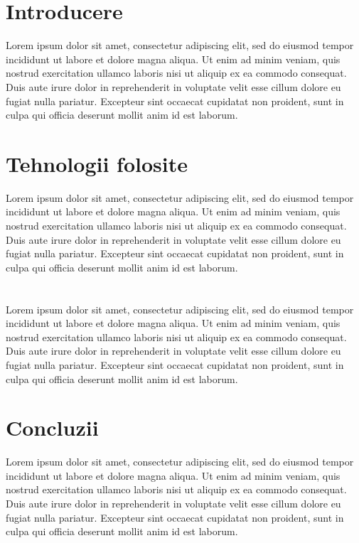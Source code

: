 \documentclass[12pt,a4paper]{article}
\begin{document}
\onehalfspacing



\newpage{} \tableofcontents{}

\newpage{}
\section{Introducere}
Lorem ipsum dolor sit amet, consectetur adipiscing elit,
sed do eiusmod tempor incididunt ut labore et dolore magna
aliqua. Ut enim ad minim veniam, quis nostrud exercitation
ullamco laboris nisi ut aliquip ex ea commodo consequat.
Duis aute irure dolor in reprehenderit in voluptate velit
esse cillum dolore eu fugiat nulla pariatur. Excepteur sint
occaecat cupidatat non proident, sunt in culpa qui officia
deserunt mollit anim id est laborum.
\newpage{}\section{Tehnologii folosite}
Lorem ipsum dolor sit amet, consectetur adipiscing elit,
sed do eiusmod tempor incididunt ut labore et dolore magna
aliqua. Ut enim ad minim veniam, quis nostrud exercitation
ullamco laboris nisi ut aliquip ex ea commodo consequat.
Duis aute irure dolor in reprehenderit in voluptate velit
esse cillum dolore eu fugiat nulla pariatur. Excepteur sint
occaecat cupidatat non proident, sunt in culpa qui officia
deserunt mollit anim id est laborum.
\newpage{}\section{}
Lorem ipsum dolor sit amet, consectetur adipiscing elit,
sed do eiusmod tempor incididunt ut labore et dolore magna
aliqua. Ut enim ad minim veniam, quis nostrud exercitation
ullamco laboris nisi ut aliquip ex ea commodo consequat.
Duis aute irure dolor in reprehenderit in voluptate velit
esse cillum dolore eu fugiat nulla pariatur. Excepteur sint
occaecat cupidatat non proident, sunt in culpa qui officia
deserunt mollit anim id est laborum.
\newpage{}\section{Concluzii}
Lorem ipsum dolor sit amet, consectetur adipiscing elit,
sed do eiusmod tempor incididunt ut labore et dolore magna
aliqua. Ut enim ad minim veniam, quis nostrud exercitation
ullamco laboris nisi ut aliquip ex ea commodo consequat.
Duis aute irure dolor in reprehenderit in voluptate velit
esse cillum dolore eu fugiat nulla pariatur. Excepteur sint
occaecat cupidatat non proident, sunt in culpa qui officia
deserunt mollit anim id est laborum.
\end{document}
